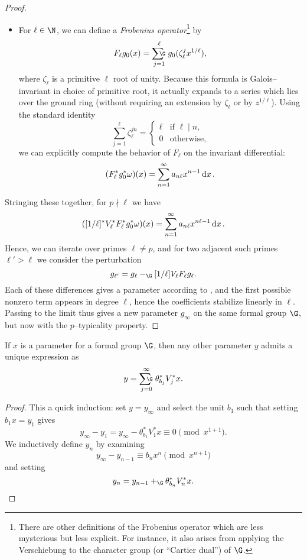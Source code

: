 \begin{proof}
\begin{itemize}
\item For \(\ell \in \N\), we can define a \textit{Frobenius operator}\footnote{There are other definitions of the Frobenius operator which are less mysterious but less explicit.  For instance, it also arises from applying the Verschiebung to the character group (or ``Cartier dual'') of \(\G\).} by \[F_\ell g_0(x) = \sumG_{j=1}^\ell g_0(\zeta_\ell^j x^{1/\ell}),\] where \(\zeta_\ell\) is a primitive \(\ell\){\th} root of unity.  Because this formula is Galois--invariant in choice of primitive root, it actually expands to a series which lies over the ground ring (without requiring an extension by \(\zeta_\ell\) or by \(z^{1/\ell}\)).  Using the standard identity \[\sum_{j=1}^\ell \zeta_\ell^{jn} = \begin{cases}\ell & \text{if \(\ell \mid n\)}, \\ 0 & \text{otherwise}, \end{cases}\] we can explicitly compute the behavior of \(F_\ell\) on the invariant differential: \[(F_\ell^* g_0^* \omega)(x) = \sum_{n=1}^\infty a_{n \ell} x^{n-1} \operatorname{d\mathit{x}}.\]
\end{itemize}
Stringing these together, for \(p \nmid \ell\) we have \[([1/\ell]^* V_\ell^* F_\ell^* g_0^* \omega)(x) = \sum_{n=1}^\infty a_{n \ell} x^{n \ell - 1} \operatorname{d\mathit{x}}.\]  Hence, we can iterate over primes \(\ell \ne p\), and for two adjacent such primes \(\ell' > \ell\) we consider the perturbation \[g_{\ell'} = g_\ell -_{\G} [1/\ell] V_\ell F_\ell g_\ell.\]  Each of these differences gives a parameter according to , and the first possible nonzero term appears in degree \(\ell\), hence the coefficients stabilize linearly in \(\ell\).  Passing to the limit thus gives a new parameter \(g_\infty\) on the same formal group \(\G\), but now with the \(p\)--typicality property.
\end{proof}

\begin{lemma}
If \(x\) is a parameter for a formal group \(\G\), then any other parameter \(y\) admits a unique expression as \[y = \sumfgl{\G}_{j=0}^\infty \theta_{b_j}^* V_j^* x.\]
\end{lemma}
\begin{proof}
This a quick induction: set \(y = y_\infty\) and select the unit \(b_1\) such that setting \(b_1 x = y_1\) gives \[y_\infty - y_1 = y_\infty - \theta_{b_1}^* V_1^* x \equiv 0 \pmod{x^{1+1}}.\]  We inductively define \(y_n\) by examining \[y_\infty - y_{n-1} \equiv b_n x^n \pmod{x^{n+1}}\] and setting \[y_n = y_{n-1} +_{\G} \theta_{b_n}^* V_n^* x. \qedhere\]
\end{proof}

